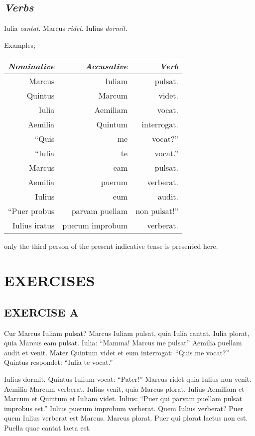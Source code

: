 \subsection{\emph{Verbs}}
Iulia \emph{cantat}. Marcus \emph{ridet}. Iulius \emph{dormit}.

Examples;

\begin{tabular}{| r | r | r |}
  \hline
  \emph{Nominative} & \emph{Accusative} & \emph{Verb}\\
  \hline
  Marcus & Iuliam & pulsat.\\
  Quintus & Marcum & videt.\\
  Iulia & Aemiliam & vocat.\\
  Aemilia & Quintum & interrogat.\\
  ``Quis & me & vocat?''\\
  ``Iulia & te & vocat.''\\
  Marcus & eam & pulsat.\\
  Aemilia & puerum & verberat.\\
  Iulius & eum & audit.\\
  ``Puer probus & parvam puellam & non pulsat!''\\
  Iulius iratus & puerum improbum & verberat.\\
  \hline
\end{tabular}

 only the third person of the present indicative tense is presented here.

\nolinenumbers

\section[Exercises]{EXERCISES}
\subsection*{EXERCISE A}
Cur Marcus Iuliam pulsat? Marcus Iuliam pulsat, quia Iulia cantat. Iulia plorat, quia Marcus eam pulsat. Iulia: ``Mamma! Marcus me pulsat'' Aemilia puellam audit et venit. Mater Quintum videt et eum interrogat: ``Quis me vocat?'' Quintus respondet: ``Iulia te vocat.''

Iulius dormit. Quintus Iulium vocat: ``Pater!'' Marcus ridet quia Iulius non venit. Aemilia Marcum verberat. Iulius venit, quia Marcus plorat. Iulius Aemiliam et Marcum et Quintum et Iuliam videt. Iulius: ``Puer qui parvam puellam pulsat improbus est.'' Iulius puerum improbum verberat. Quem Iulius verberat? Puer quem Iulius verberat est Marcus. Marcus plorat. Puer qui plorat laetus non est. Puella quae cantat laeta est.

